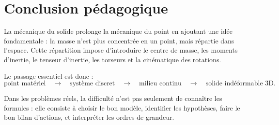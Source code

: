 \documentclass[11pt,a4paper]{article}
\begin{document}
\section*{Conclusion pédagogique}

La mécanique du solide prolonge la mécanique du point en ajoutant une idée fondamentale :
la masse n'est plus concentrée en un point, mais répartie dans l'espace.
Cette répartition impose d'introduire le centre de masse, les moments d'inertie, le tenseur d'inertie,
les torseurs et la cinématique des rotations.

Le passage essentiel est donc :
\[
\text{point matériel}
\quad\longrightarrow\quad
\text{système discret}
\quad\longrightarrow\quad
\text{milieu continu}
\quad\longrightarrow\quad
\text{solide indéformable 3D}.
\]

Dans les problèmes réels, la difficulté n'est pas seulement de connaître les formules :
elle consiste à choisir le bon modèle, identifier les hypothèses, faire le bon bilan d'actions,
et interpréter les ordres de grandeur.
\end{document}
